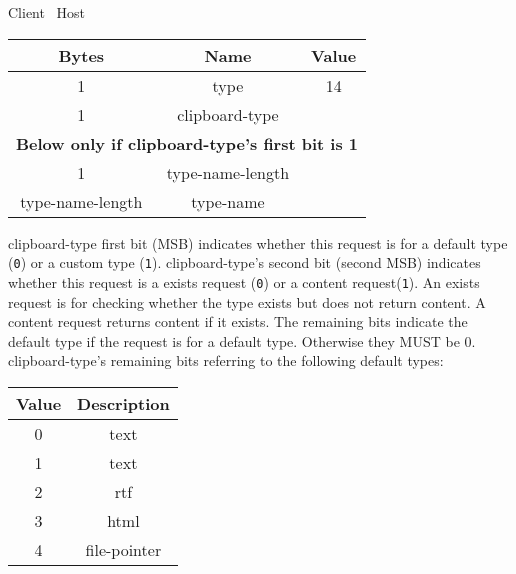 \begin{center}
    Client \textrightarrow\ Host\\
    \begin{tabular}{|c|c|c|}
        \hline
        \textbf{Bytes}   & \textbf{Name}    & \textbf{Value} \\
        \hline
        1                & type             & 14             \\
        \hline
        1                & clipboard-type   &                \\
        \hline
        \multicolumn{3}{|c|}{\textbf{Below only if clipboard-type's first bit is 1} } \\
        \hline
        1                & type-name-length &                \\
        \hline
        type-name-length & type-name        &                \\
        \hline
    \end{tabular}
\end{center}

clipboard-type first bit (MSB) indicates whether this request is for a default type (\texttt{0}) or a custom type
(\texttt{1}). clipboard-type's second bit (second MSB) indicates whether this request is a exists request (\texttt{0}) or a
content request(\texttt{1}). An exists request is for checking whether the type exists but does not return content. A
content request returns content if it exists. The remaining bits indicate the default type if the request is for a
default type. Otherwise they MUST be 0.\\

clipboard-type's remaining bits referring to the following default types:

\begin{center}
    \begin{tabular}{|c|c|}
        \hline
        \textbf{Value} & \textbf{Description} \\
        \hline
        0              & text                 \\
        \hline
        1              & text                 \\
        \hline
        2              & rtf                  \\
        \hline
        3              & html                 \\
        \hline
        4              & file-pointer         \\
        \hline
    \end{tabular}
\end{center}

